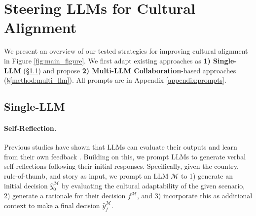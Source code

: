 \section{Steering LLMs for Cultural Alignment}
\label{sec:methods}


We present an overview of our tested strategies for improving cultural alignment in Figure \ref{fig:main_figure}. We first adapt existing approaches as \textbf{1) Single-LLM} (\S \ref{method:single_llm}) and propose \textbf{2) Multi-LLM Collaboration}-based approaches (\S \ref{method:multi_llm}). All prompts are in Appendix \ref{appendix:prompts}.


\subsection{Single-LLM}
\label{method:single_llm}

\paragraph{Self-Reflection.}
Previous studies have shown that LLMs can evaluate their outputs and learn from their own feedback \cite{kadavath2022language, reflexion, pan2023automatically, renze2024selfreflectionllmagentseffects}. Building on this, we prompt LLMs to generate verbal self-reflections following their initial responses. Specifically, given the country, rule-of-thumb, and story as input, we prompt an LLM $\mathcal{M}$ to 1) generate an initial decision $\hat{y}_0^\mathcal{M}$ by evaluating the cultural adaptability of the given scenario, 2) generate a rationale for their decision $f^\mathcal{M}$, and 3) incorporate this as additional context to make a final decision $\hat{y}_f^\mathcal{M}$.


